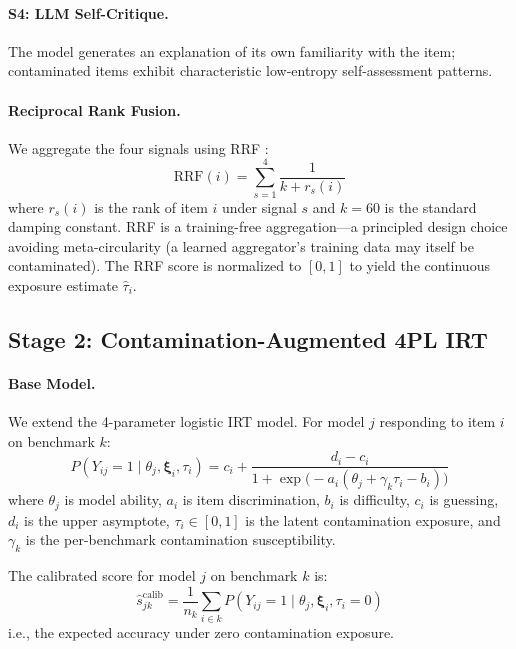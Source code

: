\documentclass[11pt,a4paper]{article}
\begin{document}
\paragraph{S4: LLM Self-Critique.}
The model generates an explanation of its own familiarity with the item; contaminated items exhibit characteristic low-entropy self-assessment patterns.

\paragraph{Reciprocal Rank Fusion.}
We aggregate the four signals using RRF \citep{cormack2009reciprocal}:
\begin{equation}
\text{RRF}(i) = \sum_{s=1}^{4} \frac{1}{k + r_s(i)}
\end{equation}
where $r_s(i)$ is the rank of item $i$ under signal $s$ and $k=60$ is the standard damping constant.
RRF is a training-free aggregation---a principled design choice avoiding meta-circularity (a learned aggregator's training data may itself be contaminated).
The RRF score is normalized to $[0,1]$ to yield the continuous exposure estimate $\hat{\tau}_i$.

\subsection{Stage 2: Contamination-Augmented 4PL IRT}
\label{sec:stage2}

\paragraph{Base Model.}
We extend the 4-parameter logistic IRT model.
For model $j$ responding to item $i$ on benchmark $k$:
\begin{equation}
P(Y_{ij}=1 \mid \theta_j, \bm{\xi}_i, \tau_i) = c_i + \frac{d_i - c_i}{1 + \exp\!\bigl(-a_i(\theta_j + \gamma_k \tau_i - b_i)\bigr)}
\label{eq:4pl}
\end{equation}
where $\theta_j$ is model ability, $a_i$ is item discrimination, $b_i$ is difficulty, $c_i$ is guessing, $d_i$ is the upper asymptote, $\tau_i \in [0,1]$ is the latent contamination exposure, and $\gamma_k$ is the per-benchmark contamination susceptibility.

The calibrated score for model $j$ on benchmark $k$ is:
\begin{equation}
\hat{s}_{jk}^{\text{calib}} = \frac{1}{n_k} \sum_{i \in k} P(Y_{ij}=1 \mid \theta_j, \bm{\xi}_i, \tau_i=0)
\end{equation}
i.e., the expected accuracy under zero contamination exposure.
\end{document}
